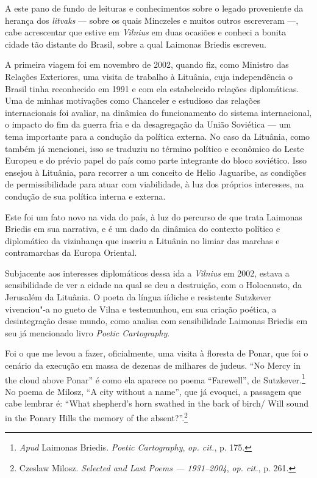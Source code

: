 A este pano de fundo de leituras e conhecimentos sobre o legado
proveniente da herança dos \textit{litvaks} --- sobre os quais Minczeles e
muitos outros escreveram ---, cabe acrescentar que estive em \textit{Vilnius} em
duas ocasiões e conheci a bonita cidade tão distante do Brasil, sobre a
qual Laimonas Briedis escreveu.

A primeira viagem foi em novembro de 2002, quando fiz, como Ministro das
Relações Exteriores, uma visita de trabalho à Lituânia, cuja
independência o Brasil tinha reconhecido em 1991 e com ela estabelecido
relações diplomáticas. Uma de minhas motivações como Chanceler e
estudioso das relações internacionais foi avaliar, na dinâmica do
funcionamento do sistema internacional, o impacto do fim da guerra fria
e da desagregação da União Soviética --- um tema importante para a
condução da política externa. No caso da Lituânia, como também já
mencionei, isso se traduziu no término político e econômico do Leste
Europeu e do prévio papel do país como parte integrante do bloco
soviético. Isso ensejou à Lituânia, para recorrer a um conceito de Helio
Jaguaribe, as condições de permissibilidade para atuar com viabilidade,
à luz dos próprios interesses, na condução de sua política interna e
externa.

Este foi um fato novo na vida do país, à luz do percurso de que trata
Laimonas Briedis em sua narrativa, e é um dado da dinâmica do contexto
político e diplomático da vizinhança que inseriu a Lituânia no limiar
das marchas e contramarchas da Europa Oriental.

Subjacente aos interesses diplomáticos dessa ida a \textit{Vilnius} em 2002,
estava a sensibilidade de ver a cidade na qual se deu a destruição, com
o Holocausto, da Jerusalém da Lituânia. O poeta da língua iídiche e
resistente Sutzkever vivenciou"-a no gueto de Vilna e testemunhou, em sua
criação poética, a desintegração desse mundo, como analisa com
sensibilidade Laimonas Briedis em seu já mencionado livro \textit{Poetic
Cartography}.

Foi o que me levou a fazer, oficialmente, uma visita à floresta de
Ponar, que foi o cenário da execução em massa de dezenas de milhares de
judeus. ``No Mercy in the cloud above Ponar'' é como ela aparece no
poema ``Farewell'', de Sutzkever.\footnote{\textit{Apud} Laimonas Briedis.
  \textit{Poetic Cartography}, \textit{op. cit.}, p. 175.} No poema de
Milosz, ``A city without a name'', que já evoquei, a passagem que cabe
lembrar é: ``What shepherd's horn swathed in the bark of birch/ Will
sound in the Ponary Hills the memory of the absent?''.\footnote{Czeslaw
  Milosz. \textit{Selected and Last Poems --- 1931--2004}, \textit{op.
  cit.}, p. 261.}

